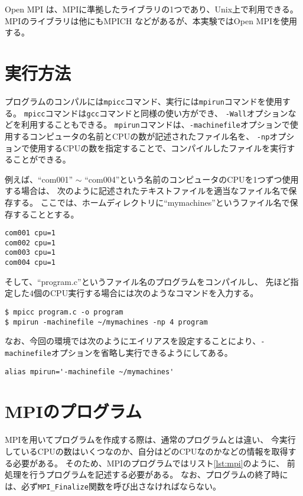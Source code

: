 \documentclass[a4j,titlepage]{jsarticle}
\begin{document}
Open MPI \cite{bib:1} は、MPIに準拠したライブラリの1つであり、Unix上で利用できる。
MPIのライブラリは他にもMPICH \cite{bib:2} などがあるが、本実験ではOpen MPIを使用する。


\section{実行方法}
プログラムのコンパルには\texttt{mpicc}コマンド、実行には\texttt{mpirun}コマンドを使用する。
\texttt{mpicc}コマンドは\texttt{gcc}コマンドと同様の使い方ができ、
\texttt{-Wall}オプションなどを利用することもできる。
\texttt{mpirun}コマンドは、\texttt{-machinefile}オプションで使用するコンピュータの名前とCPUの数が記述されたファイル名を、
\texttt{-np}オプションで使用するCPUの数を指定することで、コンパイルしたファイルを実行することができる。

例えば、``com001'' $\sim$ ``com004''という名前のコンピュータのCPUを1つずつ使用する場合は、
次のように記述されたテキストファイルを適当なファイル名で保存する。
ここでは、ホームディレクトリに``mymachines''というファイル名で保存することとする。

\begin{lstlisting}[style=text]
com001 cpu=1
com002 cpu=1
com003 cpu=1
com004 cpu=1
\end{lstlisting}

そして、``program.c''というファイル名のプログラムをコンパイルし、
先ほど指定した$4$個のCPU実行する場合には次のようなコマンドを入力する。

\begin{lstlisting}[style=text]
$ mpicc program.c -o program
$ mpirun -machinefile ~/mymachines -np 4 program
\end{lstlisting}

なお、今回の環境では次のようにエイリアスを設定することにより、\texttt{-machinefile}オプションを省略し実行できるようにしてある。

\begin{lstlisting}[style=text]
alias mpirun='-machinefile ~/mymachines'
\end{lstlisting}


\section{MPIのプログラム}
MPIを用いてプログラムを作成する際は、通常のプログラムとは違い、
今実行しているCPUの数はいくつなのか、自分はどのCPUなのかなどの情報を取得する必要がある。
そのため、MPIのプログラムではリスト\ref{lst:mpi}のように、
前処理を行うプログラムを記述する必要がある。
なお、プログラムの終了時には、必ず\texttt{MPI\_Finalize}関数を呼び出さなければならない。
\end{document}
